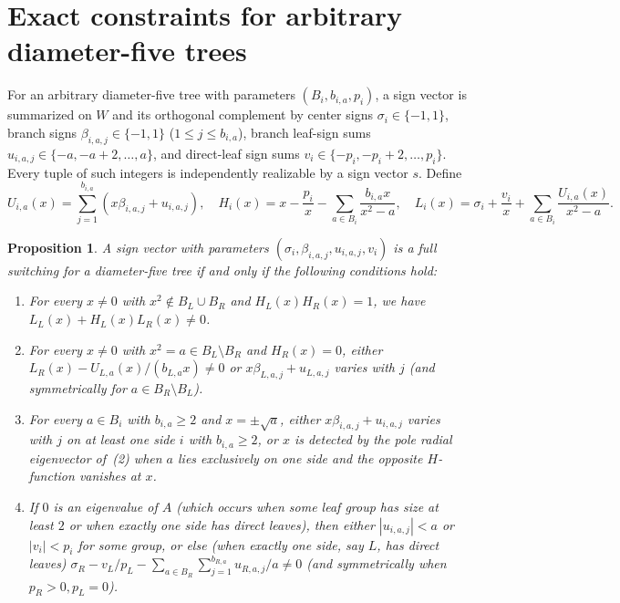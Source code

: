 \documentclass[11pt]{article}
\theoremstyle{plain}
\newtheorem{proposition}[theorem]{Proposition}
\theoremstyle{remark}
\begin{document}
\section{Exact constraints for arbitrary diameter-five trees}\label{sec:remaining}

For an arbitrary diameter-five tree with parameters $(B_i, b_{i,a}, p_i)$, a
sign vector is summarized on $W$ and its orthogonal complement by center signs
$\sigma_i \in \{-1,1\}$, branch signs $\beta_{i,a,j} \in \{-1,1\}$
($1 \leq j \leq b_{i,a}$), branch leaf-sign sums
$u_{i,a,j} \in \{-a, -a+2, \dots, a\}$, and direct-leaf sign sums
$v_i \in \{-p_i, -p_i+2, \dots, p_i\}$. Every tuple of such integers is
independently realizable by a sign vector $s$. Define
\[
  U_{i,a}(x) = \sum_{j=1}^{b_{i,a}} (x\beta_{i,a,j} + u_{i,a,j}), \quad
  H_i(x) = x - \frac{p_i}{x} - \sum_{a\in B_i} \frac{b_{i,a} x}{x^2 - a}, \quad
  L_i(x) = \sigma_i + \frac{v_i}{x} + \sum_{a\in B_i} \frac{U_{i,a}(x)}{x^2 - a}.
\]

\begin{proposition}\label{prop:constraints}
A sign vector with parameters $(\sigma_i, \beta_{i,a,j}, u_{i,a,j}, v_i)$ is a
full switching for a diameter-five tree if and only if the following conditions
hold:
\begin{enumerate}
\item For every $x \neq 0$ with $x^2 \notin B_L \cup B_R$ and
  $H_L(x) H_R(x) = 1$, we have $L_L(x) + H_L(x) L_R(x) \neq 0$.
\item For every $x \neq 0$ with $x^2 = a \in B_L \setminus B_R$ and
  $H_R(x) = 0$, either $L_R(x) - U_{L,a}(x)/(b_{L,a} x) \neq 0$ or
  $x\beta_{L,a,j} + u_{L,a,j}$ varies with $j$ (and symmetrically for
  $a \in B_R \setminus B_L$).
\item For every $a \in B_i$ with $b_{i,a} \geq 2$ and $x = \pm\sqrt{a}$, either
  $x\beta_{i,a,j} + u_{i,a,j}$ varies with $j$ on at least one side $i$ with
  $b_{i,a} \geq 2$, or $x$ is detected by the pole radial eigenvector of~(2)
  when $a$ lies exclusively on one side and the opposite $H$-function vanishes
  at $x$.
\item If $0$ is an eigenvalue of $A$ (which occurs when some leaf group has
  size at least $2$ or when exactly one side has direct leaves), then either
  $|u_{i,a,j}| < a$ or $|v_i| < p_i$ for some group, or else (when exactly one
  side, say $L$, has direct leaves)
  $\sigma_R - v_L/p_L - \sum_{a\in B_R}\sum_{j=1}^{b_{R,a}} u_{R,a,j}/a \neq 0$
  (and symmetrically when $p_R > 0, p_L = 0$).
\end{enumerate}
\end{proposition}
\end{document}
